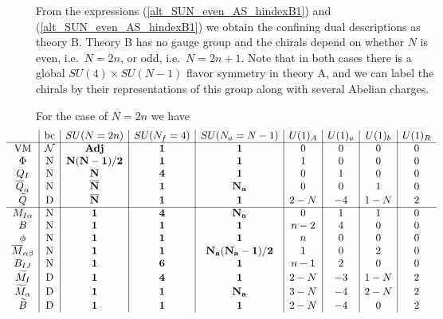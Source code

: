 \documentclass[12pt]{article}
\numberwithin{equation}{section}
\begin{document}
From the expressions (\ref{alt_SUN_even_AS_hindexB1}) and (\ref{alt_SUN_even_AS_hindexB1}) 
we obtain the confining dual descriptions as theory B. 
Theory B has no gauge group and the chirals depend on whether $N$ is even, i.e.\ $N = 2n$, or odd, i.e.\ $N = 2n + 1$. Note that in both cases there is a
global $SU(4) \times SU(N-1)$ flavor symmetry in theory A, and we can label the
chirals by their representations of this group along with several Abelian charges. 

For the case of $N = 2n$ we have
\begin{align}
\hspace*{-1cm}
\label{alt_SUN_even_AS_charges}
\begin{array}{c|c|c|c|c|c|c|c|c}
& \textrm{bc} & SU(N = 2n) & SU(N_f = 4) & SU(N_a = N - 1) & U(1)_A & U(1)_a & U(1)_b & U(1)_R \\ \hline
\textrm{VM} & \mathcal{N} & {\bf Adj} & {\bf 1} & {\bf 1} & 0 & 0 & 0 & 0 \\
\Phi & \textrm{N} & {\bf N(N-1)/2} & {\bf 1} & {\bf 1} & 1 & 0 & 0 & 0 \\
Q_I & \textrm{N} & {\bf N} & {\bf 4} & {\bf 1} & 0 & 1 & 0 & 0 \\
\overline{Q}_{\alpha} & \textrm{N} & {\bf \overline{N}} & {\bf 1} & {\bf N_a} & 0 & 0 & 1 & 0 \\
\widetilde{Q} & \textrm{D} & {\bf \overline{N}} & {\bf 1} & {\bf 1} & 2 - N & -4 & 1 - N & 2 \\
 \hline
M_{I \alpha} & \textrm{N} & {\bf 1} & {\bf 4} & {\bf N_a} & 0 & 1 & 1 & 0 \\
B & \textrm{N} & {\bf 1} & {\bf 1} & {\bf 1} & n-2 & 4 & 0 & 0 \\
\phi & \textrm{N} & {\bf 1} & {\bf 1} & {\bf 1} & n & 0 & 0 & 0 \\
\overline{M}_{\alpha \beta} & \textrm{N} & {\bf 1} & {\bf 1} & {\bf N_a(N_a-1)/2} & 1 & 0 & 2 & 0 \\
B_{IJ} & \textrm{N} & {\bf 1} & {\bf 6} & {\bf 1} & n-1 & 2 & 0 & 0 \\
\widetilde{M}_I & \textrm{D} & {\bf 1} & {\bf 4} & {\bf 1} & 2 - N & -3 & 1-N & 2 \\
\widetilde{M}_{\alpha} & \textrm{D} & {\bf 1} & {\bf 1} & {\bf N_a} & 3-N & -4 & 2-N & 2 \\
\widetilde{B} & \textrm{D} & {\bf 1} & {\bf 1} & {\bf 1} & 2-N & -4 & 0 & 2 \\
\end{array}
\end{align}
\end{document}
